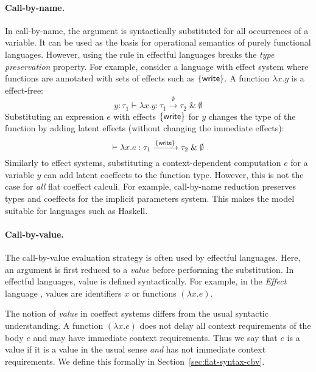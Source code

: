 \paragraph{Call-by-name.} 
In call-by-name, the argument is syntactically substituted for all occurrences of a variable. It
can be used as the basis for operational semantics of purely functional languages. However, using
the rule in effectful languages breaks the \emph{type preservation} property. For example, consider
a language with effect system where functions are annotated with sets of effects such as $\{ \textnormal{\sffamily write} \}$.
A function $\lambda x.y$ is a effect-free:
%
\begin{equation*}
y\!:\!\tau_1 \vdash \lambda x.y : \tau_1 \xrightarrow{\emptyset} \tau_2 \;\&\; \emptyset
\end{equation*}
%
Substituting an expression $e$ with effects $\{ \textnormal{\sffamily write} \}$ for $y$ changes the type of 
the function by adding latent effects (without changing the immediate effects):
%
\begin{equation*}
\vdash \lambda x.e : \tau_1 \xrightarrow{ \{ \textnormal{\sffamily write} \} } \tau_2 \;\&\; \emptyset
\end{equation*}
%
Similarly to effect systems, substituting a context-dependent computation $e$ for a variable $y$ can
add latent coeffects to the function type. However, this is not the case for \emph{all} flat coeffect
calculi. For example, call-by-name reduction preserves types and coeffects for the implicit 
parameters system. This makes the model suitable for languages such as Haskell.

\paragraph{Call-by-value.}

The call-by-value evaluation strategy is often used by effectful languages. Here, an argument is
first reduced to a \emph{value} before performing the substitution. In effectful languages, 
value is defined syntactically. For example, in the \emph{Effect} language \cite{monads-effects-marriage},
values are identifiers $x$ or functions $(\lambda x.e)$.

The notion of \emph{value} in coeffect systems differs from the usual syntactic understanding.
A function $(\lambda x.e)$ does not delay all context requirements of the body $e$ and may have
immediate context requirements. Thus we say that $e$ is a value if it is a value in the usual
sense \emph{and} has not immediate context requirements. We define this formally in 
Section~\ref{sec:flat-syntax-cbv}.

